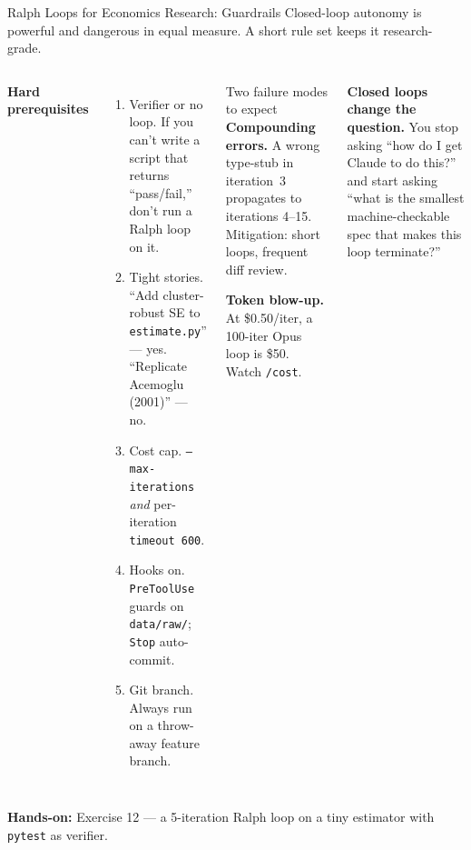 \documentclass[aspectratio=169,10pt]{beamer}
\newcommand{\emphc}[1]{\textcolor{harvardcrimson}{#1}}
\begin{document}
\begin{frame}{Ralph Loops for Economics Research: Guardrails}
\scriptsize
Closed-loop autonomy is powerful and dangerous in equal measure. A short rule
set keeps it research-grade.

\vspace{0.3em}
\begin{columns}[T]
\textbf{Hard prerequisites}
\begin{enumerate}\itemsep0pt
  \item \emphc{Verifier or no loop.} If you can't write a script that returns
        ``pass/fail,'' don't run a Ralph loop on it.
  \item \emphc{Tight stories.} ``Add cluster-robust SE to \texttt{estimate.py}''
        --- yes. ``Replicate Acemoglu (2001)'' --- no.
  \item \emphc{Cost cap.} \texttt{--max-iterations} \emph{and} per-iteration
        \texttt{timeout 600}.
  \item \emphc{Hooks on.} \texttt{PreToolUse} guards on \texttt{data/raw/};
        \texttt{Stop} auto-commit.
  \item \emphc{Git branch.} Always run on a throw-away feature branch.
\end{enumerate}

\begin{alertblock}{Two failure modes to expect}
\tiny
\textbf{Compounding errors.} A wrong type-stub in iteration~3 propagates to
iterations 4--15. Mitigation: short loops, frequent diff review.

\vspace{0.3em}
\textbf{Token blow-up.} At \$0.50/iter, a 100-iter Opus loop is \$50.
Watch \texttt{/cost}.
\end{alertblock}

\vspace{0.2em}
\textbf{Closed loops change the question.} You stop asking
``how do I get Claude to do this?'' and start asking ``what is the smallest
machine-checkable spec that makes this loop terminate?''
\end{columns}

\vspace{0.2em}
\textbf{Hands-on:} \emphc{Exercise 12} --- a 5-iteration Ralph loop on a tiny estimator with \texttt{pytest} as verifier.
\end{frame}

\end{document}

